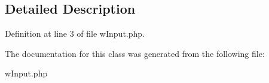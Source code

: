 \subsection{Detailed Description}


Definition at line 3 of file wInput.php.



The documentation for this class was generated from the following file:\begin{DoxyCompactItemize}
\item 
wInput.php\end{DoxyCompactItemize}
